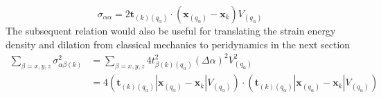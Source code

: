 \documentclass[a4paper,11pt,CJK]{paper}
\newcommand{\bft}{\textbf{t}}
\newcommand{\bfx}{\textbf{x}}
\begin{document}
\begin{equation}
\sigma_{\alpha\alpha} = 2 \bft_{(k)(q_\alpha)}\cdot(\bfx_{(q_\alpha)}-\bfx_{k})V_{(q_\alpha)}
\end{equation}
The subsequent relation would also be useful for translating the strain energy density and dilation from classical mechanics to peridynamics in the next section
\begin{equation}
\begin{aligned}
\sum_{\beta=x,y,z}\sigma_{\alpha\beta(k)}^2 &= \sum_{\beta=x,y,z}4t_{\beta(k)(q_\alpha)}^2(\Delta\alpha)^2 V_{(q_\alpha)}^2 \\
                                            &= 4(\bft_{(k)(q_\alpha)}|\bfx_{(q_\alpha)}-\bfx_{k}|V_{(q_\alpha)})
                                                 \cdot
                                                (\bft_{(k)(q_\alpha)}|\bfx_{(q_\alpha)}-\bfx_{k}|V_{(q_\alpha)})
\end{aligned}
\end{equation}
\end{document}
